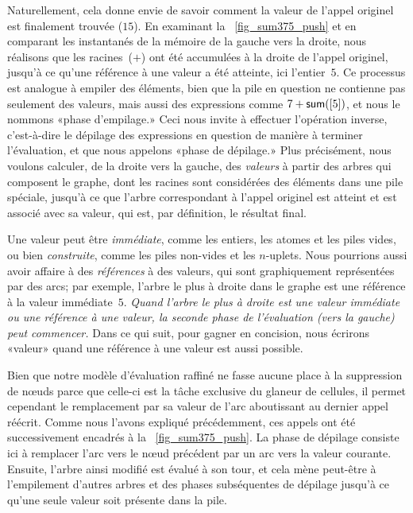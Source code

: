 Naturellement, cela donne envie de savoir comment la valeur de l'appel
originel est finalement trouvée (\(15\)). En examinant la
\fig~\ref{fig_sum375_push} et en comparant les instantanés de la
mémoire de la gauche vers la droite, nous réalisons que les
racines~(\(+\)) ont été accumulées à la droite de l'appel originel,
jusqu'à ce qu'une référence à une valeur a été atteinte, ici
l'entier~\(5\). Ce processus est analogue à empiler des éléments, bien
que la pile en question ne contienne pas seulement des valeurs, mais
aussi des expressions comme \(7 + \textsf{sum}([5])\), et nous le nommons
«phase d'empilage.» Ceci nous invite à effectuer l'opération inverse,
c'est-à-dire le dépilage des expressions en question de manière à
terminer l'évaluation, et que nous appelons «phase de dépilage.» Plus
précisément, nous voulons calculer, de la droite vers la gauche, des
\emph{valeurs} à partir des arbres qui composent le graphe, dont les
racines sont considérées des éléments dans une pile spéciale, jusqu'à
ce que l'arbre correspondant à l'appel originel est atteint et est
associé avec sa valeur, qui est, par définition, le résultat final.

Une valeur peut être \emph{immédiate}, comme les entiers, les atomes
et les piles vides, ou bien \emph{construite}, comme les piles
non-vides et les \(n\)-uplets. Nous pourrions aussi avoir affaire à
des \emph{références} à des valeurs, qui sont graphiquement
représentées par des arcs; par exemple, l'arbre le plus à droite dans
le graphe est une référence à la valeur immédiate~\(5\). \emph{Quand
  l'arbre le plus à droite est une valeur immédiate ou une référence à
  une valeur, la seconde phase de l'évaluation (vers la gauche) peut
  commencer.} Dans ce qui suit, pour gagner en concision, nous
écrirons «valeur» quand une référence à une valeur est aussi possible.

Bien que notre modèle d'évaluation raffiné ne fasse aucune place à la
suppression de n{\oe}uds parce que celle-ci est la tâche exclusive du
glaneur de cellules, il permet cependant le remplacement par sa valeur
de l'arc aboutissant au dernier appel réécrit. Comme nous l'avons
expliqué précédemment, ces appels ont été successivement encadrés à la
\fig~\vref{fig_sum375_push}. La phase de dépilage consiste ici à
remplacer l'arc vers le n{\oe}ud  précédent par un arc vers
la valeur courante. Ensuite, l'arbre ainsi modifié est évalué à son
tour, et cela mène peut-être à l'empilement d'autres arbres et des
phases subséquentes de dépilage jusqu'à ce qu'une seule valeur soit
présente dans la pile.


